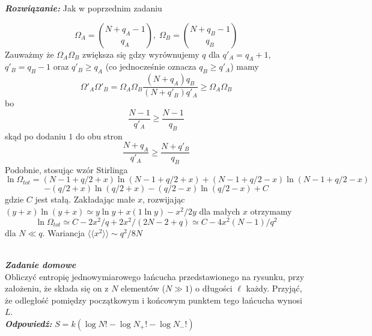 \documentclass[11pt,a4paper]{article}
\newcounter{zaddom}\newcommand{\zaddom}[1][]{\addtocounter{zaddom}{1} ~\\  {\bf \emph{Zadanie domowe \arabic{zaddom} #1 }} \\}
\begin{document}
{\bf \em Rozwiązanie:} Jak w poprzednim zadaniu

\[
\Omega_A=\binom{N+q_A-1}{q_A},\;\Omega_B=\binom{N+q_B-1}{q_B}
\]
Zauważmy że $\Omega_A\Omega_B$ zwiększa się gdzy wyrównujemy $q$
dla $q'_A=q_A+1$, $q'_B=q_B-1$ oraz $q'_B\geq q_A$ (co jednocześnie oznacza $q_B\geq q'_A$)
mamy
\[
\Omega'_A\Omega'_B=\Omega_A\Omega_B\frac{(N+q_A)q_B}{(N+q'_B)q'_A}\geq \Omega_A\Omega_B
\]
bo 
\[
\frac{N-1}{q'_A}\geq \frac{N-1}{q_B}
\] 
skąd po dodaniu $1$ do obu stron
\[
\frac{N+q_A}{q'_A}\geq\frac{N+q'_B}{q_B}
\]
Podobnie, stosując wzór Stirlinga
\[
\ln\Omega_{tot}=(N-1+q/2+x)\ln(N-1+q/2+x)+(N-1+q/2-x)\ln(N-1+q/2-x)
\]
\[
-(q/2+x)\ln(q/2+x)-(q/2-x)\ln(q/2-x)+C
\]
gdzie $C$ jest stałą.
Zakładając małe $x$, rozwijając $(y+x)\ln(y+x)\simeq y\ln y+x(1\ln y)-x^2/2y$ dla małych $x$ otrzymamy
\[
\ln\Omega_{tot}\simeq C-2x^2/q+2x^2/(2N-2+q)\simeq C-4x^2(N-1)/q^2
\]
dla $N\ll q$. Wariancja $\langle\langle x^2\rangle\rangle\sim q^2/8N$

\vspace*{1cm}

\begin{figure}\vspace{-3mm}
\end{figure}
\zaddom
Obliczyć entropię jednowymiarowego łańcucha przedstawionego na rysunku, przy założeniu,
że składa się on z $N$ elementów ($N\gg 1$) o długości $\ell$ każdy. 
Przyjąć, że odległość pomiędzy początkowym i
końcowym punktem tego łańcucha wynosi $L$.\\
{\bf \em Odpowiedź:} $S=k(\log N!-\log N_+!-\log N_-!)$
\end{document}
